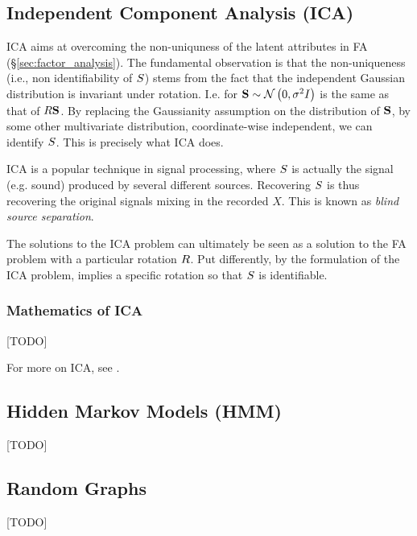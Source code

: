 \subsection{Independent Component Analysis (ICA)}
ICA aims at overcoming the non-uniquness of the latent attributes in FA (\S\ref{sec:factor_analysis}).
The fundamental observation is that the non-uniqueness (i.e., non identifiability of $S$) stems from the fact that the independent Gaussian distribution is invariant under rotation. I.e. for $\mathbf{S} \sim \mathcal{N}\left(0,\sigma^2 I\right)$ is the same as that of $R \mathbf{S}$. 
By replacing the Gaussianity assumption on the distribution of $\mathbf{S}$, by some other multivariate distribution, coordinate-wise independent, we can identify $S$. 
This is precisely what ICA does. 

\begin{remark}
ICA is a popular technique in signal processing, where $S$ is actually the signal (e.g. sound) produced by several different sources. Recovering $S$ is thus recovering the original signals mixing in the recorded $X$. This is known as \emph{blind source separation}.
\end{remark}

\begin{remark}
The solutions to the ICA problem can ultimately be seen as a solution to the FA problem with a particular rotation $R$.
Put differently, by the formulation of the ICA problem, implies a specific rotation so that $S$ is identifiable. 
\end{remark}



\subsubsection{Mathematics of ICA}
[TODO]


For more on ICA, see \cite{hyvarinen_independent_2000}. 







\subsection{Hidden Markov Models (HMM)}
\label{sec:hmm}
[TODO]





\subsection{Random Graphs}
\label{sec:random_graphs}
[TODO]


